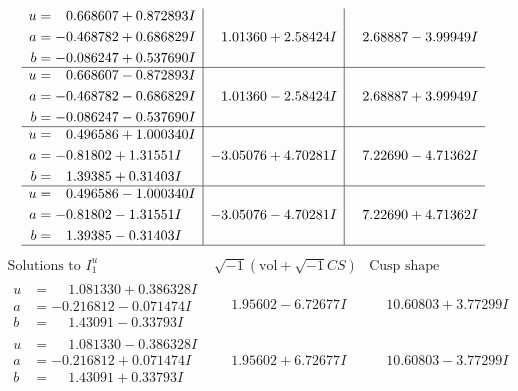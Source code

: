 \documentclass[1p]{elsarticle_modified}
\theoremstyle{definition}
\newcommand{\I}{\sqrt{-1}}
\begin{document}
$$\begin{array}{c|c|c}
\begin{aligned}
u &= \phantom{-}0.668607 + 0.872893 I \\
a &= -0.468782 + 0.686829 I \\
b &= -0.086247 + 0.537690 I\end{aligned}
 & \phantom{-}1.01360 + 2.58424 I & \phantom{-}2.68887 - 3.99949 I \\ \hline\begin{aligned}
u &= \phantom{-}0.668607 - 0.872893 I \\
a &= -0.468782 - 0.686829 I \\
b &= -0.086247 - 0.537690 I\end{aligned}
 & \phantom{-}1.01360 - 2.58424 I & \phantom{-}2.68887 + 3.99949 I \\ \hline\begin{aligned}
u &= \phantom{-}0.496586 + 1.000340 I \\
a &= -0.81802 + 1.31551 I \\
b &= \phantom{-}1.39385 + 0.31403 I\end{aligned}
 & -3.05076 + 4.70281 I & \phantom{-}7.22690 - 4.71362 I \\ \hline\begin{aligned}
u &= \phantom{-}0.496586 - 1.000340 I \\
a &= -0.81802 - 1.31551 I \\
b &= \phantom{-}1.39385 - 0.31403 I\end{aligned}
 & -3.05076 - 4.70281 I & \phantom{-}7.22690 + 4.71362 I\\
 \hline 
 \end{array}$$\newpage$$\begin{array}{c|c|c}  
\text{Solutions to }I^u_{1}& \I (\text{vol} + \sqrt{-1}CS) & \text{Cusp shape}\\
 \hline 
\begin{aligned}
u &= \phantom{-}1.081330 + 0.386328 I \\
a &= -0.216812 - 0.071474 I \\
b &= \phantom{-}1.43091 - 0.33793 I\end{aligned}
 & \phantom{-}1.95602 - 6.72677 I & \phantom{-}10.60803 + 3.77299 I \\ \hline\begin{aligned}
u &= \phantom{-}1.081330 - 0.386328 I \\
a &= -0.216812 + 0.071474 I \\
b &= \phantom{-}1.43091 + 0.33793 I\end{aligned}
 & \phantom{-}1.95602 + 6.72677 I & \phantom{-}10.60803 - 3.77299 I \\ \hline\begin{aligned}

\end{aligned}
\end{array}$$
\end{document}
